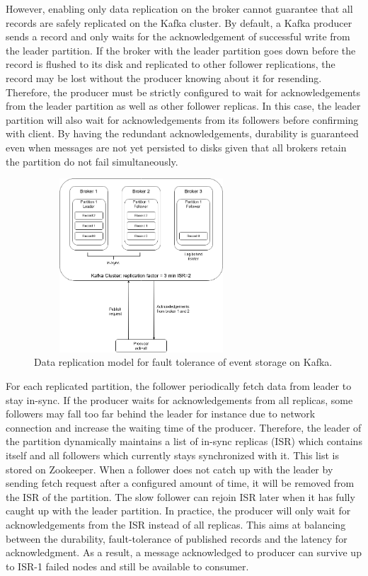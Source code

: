 However, enabling only data replication on the broker cannot guarantee that all records are safely replicated on the Kafka cluster.  By default, a Kafka producer sends a record and only waits for the acknowledgement of successful write from the leader partition. If the broker with the leader partition goes down before the record is flushed to its disk and replicated to other follower replications, the record may be lost without the producer knowing about it for resending. Therefore, the producer must be strictly configured to wait for acknowledgements from the leader partition as well as other follower replicas. In this case, the leader partition will also wait for acknowledgements from its followers before confirming with client. By having the redundant acknowledgements, durability is guaranteed even when messages are not yet persisted to disks given that all brokers retain the partition do not fail simultaneously. 
\begin{figure}[h]
	\centering
	\includegraphics[width=8cm,height=6.5cm]{images/ft-eventstorage-kafka.png}
	\caption{Data replication model for fault tolerance of event storage on Kafka.}
	\label{fig:fteventstorekafka}
\end{figure}

For each replicated partition, the follower periodically fetch data from leader to stay in-sync. If the producer waits for acknowledgements from all replicas, some followers may fall too far behind the leader for instance due to network connection and increase the waiting time of the producer. Therefore, the leader of the partition dynamically maintains a list of in-sync replicas (ISR) which contains itself and all followers which currently stays synchronized with it. This list is stored on Zookeeper. When a follower does not catch up with the leader by sending fetch request after a configured amount of time, it will be removed from the ISR of the partition. The slow follower can rejoin ISR later when it has fully caught up with the leader partition. In practice, the producer will only wait for acknowledgements from the ISR instead of all replicas. This aims at balancing between the durability, fault-tolerance of published records and the latency for acknowledgment. As a result, a message acknowledged to producer can survive up to ISR-1 failed nodes and still be available to consumer.

